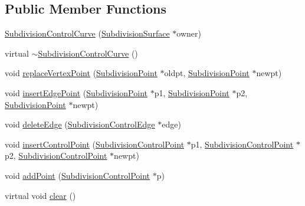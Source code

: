 \subsection*{Public Member Functions}
\begin{DoxyCompactItemize}
\item 
\hyperlink{classShipCADGeometry_1_1SubdivisionControlCurve_adfdaa3dcd794901f3c1277223eab22f9}{Subdivision\-Control\-Curve} (\hyperlink{classShipCADGeometry_1_1SubdivisionSurface}{Subdivision\-Surface} $\ast$owner)
\item 
virtual \hyperlink{classShipCADGeometry_1_1SubdivisionControlCurve_a5b3d3e0b700afd7a7a1da0e5dfafdfb9}{$\sim$\-Subdivision\-Control\-Curve} ()
\item 
void \hyperlink{classShipCADGeometry_1_1SubdivisionControlCurve_a078fc8820a6c0e37c475eec1897b13dd}{replace\-Vertex\-Point} (\hyperlink{classShipCADGeometry_1_1SubdivisionPoint}{Subdivision\-Point} $\ast$oldpt, \hyperlink{classShipCADGeometry_1_1SubdivisionPoint}{Subdivision\-Point} $\ast$newpt)
\item 
void \hyperlink{classShipCADGeometry_1_1SubdivisionControlCurve_a0764f5d7697b76ac928a121d224733f5}{insert\-Edge\-Point} (\hyperlink{classShipCADGeometry_1_1SubdivisionPoint}{Subdivision\-Point} $\ast$p1, \hyperlink{classShipCADGeometry_1_1SubdivisionPoint}{Subdivision\-Point} $\ast$p2, \hyperlink{classShipCADGeometry_1_1SubdivisionPoint}{Subdivision\-Point} $\ast$newpt)
\item 
void \hyperlink{classShipCADGeometry_1_1SubdivisionControlCurve_abfed48331919c4d2a2bfc6363b28ebb4}{delete\-Edge} (\hyperlink{classShipCADGeometry_1_1SubdivisionControlEdge}{Subdivision\-Control\-Edge} $\ast$edge)
\item 
void \hyperlink{classShipCADGeometry_1_1SubdivisionControlCurve_a9469b178a88269d0f9ee3b17d5f15272}{insert\-Control\-Point} (\hyperlink{classShipCADGeometry_1_1SubdivisionControlPoint}{Subdivision\-Control\-Point} $\ast$p1, \hyperlink{classShipCADGeometry_1_1SubdivisionControlPoint}{Subdivision\-Control\-Point} $\ast$p2, \hyperlink{classShipCADGeometry_1_1SubdivisionControlPoint}{Subdivision\-Control\-Point} $\ast$newpt)
\item 
void \hyperlink{classShipCADGeometry_1_1SubdivisionControlCurve_a1155b0abe401a7128369a589b6e6ac9c}{add\-Point} (\hyperlink{classShipCADGeometry_1_1SubdivisionControlPoint}{Subdivision\-Control\-Point} $\ast$p)
\item 
virtual void \hyperlink{classShipCADGeometry_1_1SubdivisionControlCurve_aa574f77f4abc5a8eef05e7cef7f8d8a2}{clear} ()

\end{DoxyCompactItemize}

